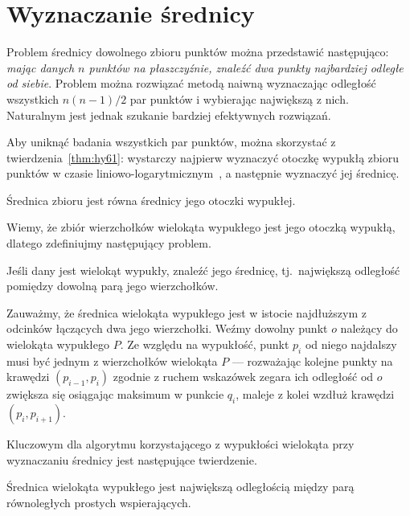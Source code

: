 \chapter{Wyznaczanie średnicy\label{chap:diameter}}
Problem średnicy dowolnego zbioru punktów można przedstawić
następująco: \emph{mając danych $n$ punktów na płaszczyźnie, znaleźć
  dwa punkty najbardziej odległe od siebie}. Problem można rozwiązać
metodą naiwną wyznaczając odległość wszystkich $n(n-1)/2$ par punktów
i wybierając największą z nich. Naturalnym jest jednak szukanie
bardziej efektywnych rozwiązań.

Aby uniknąć badania wszystkich par punktów, można skorzystać z
twierdzenia~\ref{thm:hy61}: wystarczy najpierw wyznaczyć otoczkę
wypukłą zbioru punktów w czasie
liniowo-logarytmicznym~\cite{Graham72}, a następnie wyznaczyć jej
średnicę.

\begin{twierdzenie}
  Średnica zbioru jest równa średnicy jego otoczki wypukłej.
\end{twierdzenie}

Wiemy, że zbiór wierzchołków wielokąta wypukłego jest jego otoczką
wypukłą, dlatego zdefiniujmy następujący problem.

\begin{problem}
  Jeśli dany jest wielokąt wypukły, znaleźć jego średnicę,
  tj.\ największą odległość pomiędzy dowolną parą jego wierzchołków.
\end{problem}

Zauważmy, że średnica wielokąta wypukłego jest w istocie najdłuższym z
odcinków łączących dwa jego wierzchołki. Weźmy dowolny punkt $o$
należący do wielokąta wypukłego $P$. Ze względu na wypukłość, punkt
$p_i$ od niego najdalszy musi być jednym z wierzchołków wielokąta $P$
--- rozważając kolejne punkty na krawędzi $(p_{i-1}, p_i)$ zgodnie z
ruchem wskazówek zegara ich odległość od $o$ zwiększa się osiągając
maksimum w punkcie $q_i$, maleje z kolei wzdłuż krawędzi $(p_i,
p_{i+1})$.

Kluczowym dla algorytmu korzystającego z wypukłości wielokąta przy
wyznaczaniu średnicy jest następujące twierdzenie.

\begin{twierdzenie}
\label{thm:yagbol}
  Średnica wielokąta wypukłego jest największą odległością między parą
  równoległych prostych wspierających.
\end{twierdzenie}

